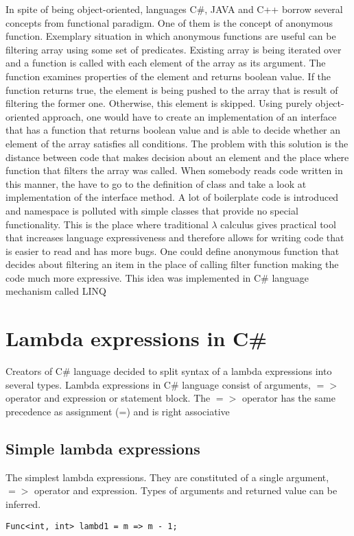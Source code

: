 \documentclass[]{report}
\begin{document}
    In spite of being object-oriented, languages C\#, JAVA and C++ borrow several concepts from functional paradigm. One of them is the concept of anonymous function. Exemplary situation in which anonymous functions are useful can be filtering array using some set of predicates. Existing array is being iterated over and a function is called with each element of the array as its argument. The function examines properties of the element and returns boolean value. If the function returns true, the element is being pushed to the array that is result of filtering the former one. Otherwise, this element is skipped. 
    Using purely object-oriented approach, one would have to create an implementation of an interface that has a function that returns boolean value and is able to decide whether an element of the array satisfies all conditions. The problem with this solution is the distance between code that makes decision about an element and the place where function that filters the array was called. When somebody reads code written in this manner, the have to go to the definition of class and take a look at implementation of the interface method. A lot of boilerplate code is introduced and namespace is polluted with simple classes that provide no special functionality.
    This is the place where traditional $\lambda$ calculus gives practical tool that increases language expressiveness and therefore allows for writing code that is easier to read and has more bugs. One could define anonymous function that decides about filtering an item in the place of calling filter function making the code much more expressive. This idea was implemented in C\# language mechanism called LINQ 
    
    \section{Lambda expressions in C\#}\label{lambdatypes}
    Creators of C\# language decided to split syntax of a lambda expressions into several types.
    Lambda expressions in C\# language consist of arguments, $=>$ operator and expression or statement block.
    The $=>$ operator has the same precedence as assignment (=) and is right associative \cite{csharplambdasyntax}
    
    \subsection{Simple lambda expressions}
    The simplest lambda expressions. They are constituted of a single argument, $=>$ operator and expression. Types of arguments and returned value can be inferred. 
    \begin{lstlisting}[style=sharpc, caption=This lambda has single integer argument m and returns an integer m - 1]
    Func<int, int> lambd1 = m => m - 1;
    \end{lstlisting}
\end{document}
